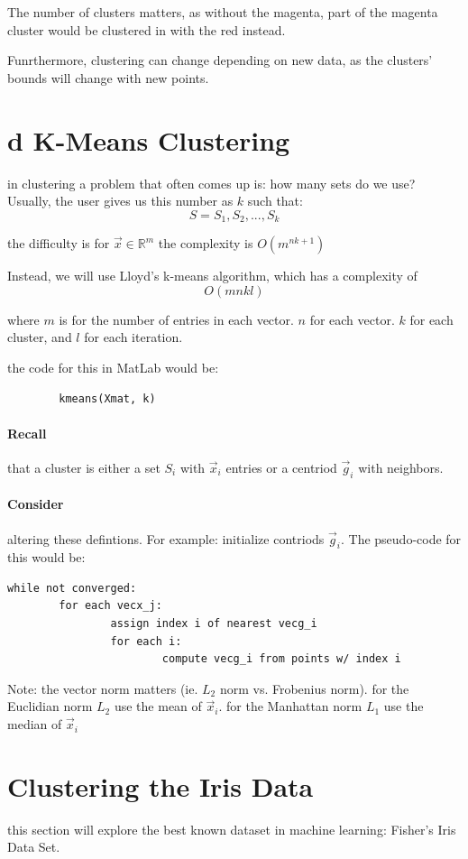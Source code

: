 \documentclass[12pt]{book}
\begin{document}
\begin{itemize}
The number of clusters matters, as without the magenta, part of the 
magenta cluster would be clustered in with the red instead.

Funrthermore, clustering can change depending on new data, as the
clusters' bounds will change with new points.
\end{itemize}

\section*{d K-Means Clustering}
in clustering a problem that often comes up is: how many sets do we use?
Usually, the user gives us this number as $k$ such that:
\[S = S_1, S_2, ..., S_k\]

the difficulty is for $\vec x \in \mathbb{R}^m$ the complexity is $O(m^{nk+1})$


Instead, we will use Lloyd's k-means algorithm, which has a complexity of
\[O(mnkl)\]

where $m$ is for the number of entries in each vector. $n$ for each vector.
$k$ for each cluster, and $l$ for each iteration.

the code for this in MatLab would be:
\begin{verbatim}
        kmeans(Xmat, k)
\end{verbatim}

\paragraph{Recall}
that a cluster is either a set $S_i$ with $\vec x_i$ entries or 
a centriod $\vec g_i$ with neighbors.

\paragraph{Consider}
altering these defintions. For example: initialize contriods $\vec g_i$.
The pseudo-code for this would be:
{\small
\begin{verbatim}
while not converged:
        for each vecx_j:
                assign index i of nearest vecg_i
                for each i:
                        compute vecg_i from points w/ index i
\end{verbatim}
}
Note: the vector norm matters (ie. $L_2$ norm vs. Frobenius norm).
for the Euclidian norm $L_2$ use the mean of $\vec x_i$. for the 
Manhattan norm $L_1$ use the median of $\vec x_i$

\section*{Clustering the Iris Data}
this section will explore the best known dataset in machine learning: Fisher's
Iris Data Set.
\end{document}
